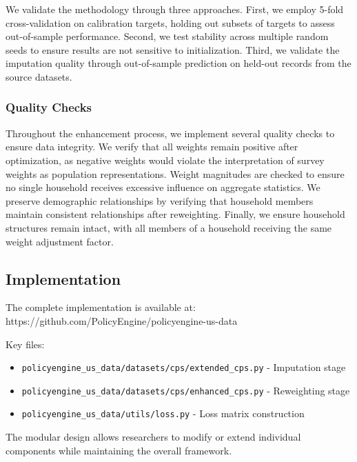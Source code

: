 We validate the methodology through three approaches. First, we employ 5-fold cross-validation on calibration targets, holding out subsets of targets to assess out-of-sample performance. Second, we test stability across multiple random seeds to ensure results are not sensitive to initialization. Third, we validate the imputation quality through out-of-sample prediction on held-out records from the source datasets.

\subsubsection{Quality Checks}

Throughout the enhancement process, we implement several quality checks to ensure data integrity. We verify that all weights remain positive after optimization, as negative weights would violate the interpretation of survey weights as population representations. Weight magnitudes are checked to ensure no single household receives excessive influence on aggregate statistics. We preserve demographic relationships by verifying that household members maintain consistent relationships after reweighting. Finally, we ensure household structures remain intact, with all members of a household receiving the same weight adjustment factor.

\subsection{Implementation}

The complete implementation is available at:
https://github.com/PolicyEngine/policyengine-us-data

Key files:
\begin{itemize}
\item \texttt{policyengine\_us\_data/datasets/cps/extended\_cps.py} - Imputation stage
\item \texttt{policyengine\_us\_data/datasets/cps/enhanced\_cps.py} - Reweighting stage
\item \texttt{policyengine\_us\_data/utils/loss.py} - Loss matrix construction
\end{itemize}

The modular design allows researchers to modify or extend individual components while maintaining the overall framework.
